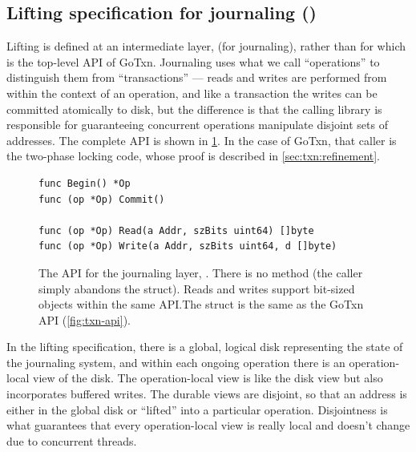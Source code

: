 \subsection{Lifting specification for journaling ()}
\label{sec:txn:lifting}

Lifting is defined at an intermediate layer,  (for journaling), rather
than for  which is the top-level API of GoTxn. Journaling uses what we
call ``operations'' to distinguish them from ``transactions'' --- reads and
writes are performed from within the context of an operation, and like a
transaction the writes can be committed atomically to
disk, but the difference is that the calling library is responsible for guaranteeing
concurrent operations manipulate disjoint sets of addresses. The complete API is
shown in \cref{fig:jrnl-api}. In the case of GoTxn, that caller is
the two-phase locking code, whose proof is described in \cref{sec:txn:refinement}.

\begin{figure}[ht]
  \begin{verbatim}
func Begin() *Op
func (op *Op) Commit()

func (op *Op) Read(a Addr, szBits uint64) []byte
func (op *Op) Write(a Addr, szBits uint64, d []byte)
  \end{verbatim}
  \caption[jrnl API]{The API for the journaling layer, . There is no
     method (the caller simply abandons the  struct). Reads
    and writes support bit-sized objects within the same API.\@ The 
    struct is the same as the GoTxn API (\cref{fig:txn-api}).}
  \label{fig:jrnl-api}
\end{figure}

In the lifting specification, there is a global, logical disk representing the
state of the journaling system, and within each ongoing operation there is an
operation-local view of the disk. The operation-local view is like the disk
view but also incorporates buffered writes. The durable views are disjoint, so
that an address is either in the global disk or ``lifted'' into a particular
operation. Disjointness is what guarantees that every operation-local view is really local and
doesn't change due to concurrent threads.

